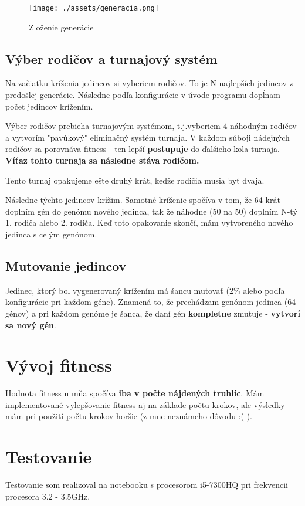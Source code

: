 \documentclass[10pt,oneside,slovak,a4paper]{article}
\begin{document}
\begin{figure}[h]
\centerline{\texttt{[image: ./assets/generacia.png]}} 
\caption{Zloženie generácie}
\end{figure}

\subsection{Výber rodičov a turnajový systém}
Na začiatku kríženia jedincov si vyberiem rodičov. To je N najlepších jedincov z predošlej generácie.
Následne podľa konfigurácie v úvode programu dopĺnam počet jedincov krížením.

Výber rodičov prebieha turnajovým systémom, t.j.vyberiem 4 náhodným rodičov a vytvorím "pavúkový" eliminačný systém turnaja.
V každom súboji nádejných rodičov sa porovnáva fitness - ten lepší \textbf{postupuje} do ďalšieho kola turnaja.
\textbf{Víťaz tohto turnaja sa následne stáva rodičom.}

Tento turnaj opakujeme ešte druhý krát, kedže rodičia musia byť dvaja.

Následne týchto jedincov krížim.
Samotné kríženie spočíva v tom, že 64 krát doplním gén do genómu nového jedinca, tak že náhodne (50 na 50) doplním N-tý 1. rodiča alebo 2. rodiča.
Keď toto opakovanie skončí, mám vytvoreného nového jedinca s celým genónom. 

\subsection{Mutovanie jedincov}

Jedinec, ktorý bol vygenerovaný krížením má šancu mutovať (2\% alebo podľa konfigurácie pri každom géne).
Znamená to, že prechádzam genónom jedinca (64 génov) a pri každom genóme je šanca, že daní gén\textbf{ kompletne} zmutuje - \textbf{vytvorí sa nový gén}.



\section{Vývoj fitness}

Hodnota fitness u mňa spočíva\textbf{ iba v počte nájdených truhlíc}. Mám implementované vylepšovanie fitness aj na základe počtu krokov, ale výsledky mám pri použití počtu krokov horšie (z mne neznámeho dôvodu :( ).



\section{Testovanie}
Testovanie som realizoval na notebooku s procesorom i5-7300HQ pri frekvencii procesora 3.2 - 3.5GHz.
\end{document}
